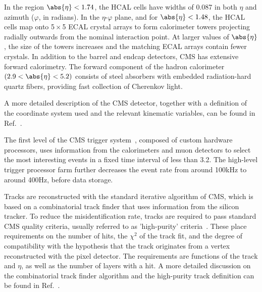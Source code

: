 \documentclass[11pt,twoside,a4paper,cmspaper,final,collab]{cms-tdr}
\begin{document}
 In the region $\abs{ \eta }< 1.74$, the HCAL cells have widths of 0.087 in both $\eta$ and azimuth ($\varphi$, in radians). In the $\eta$-$\varphi$ plane, and for $\abs{\eta}< 1.48$, the HCAL cells map onto 5${}\times{}$5 ECAL crystal arrays to form calorimeter towers projecting radially outwards from the nominal interaction point. At larger values of $\abs{ \eta }$, the size of the towers increases and the matching ECAL arrays contain fewer crystals. In addition to the barrel and endcap detectors, CMS has extensive forward calorimetry. The forward component of the hadron calorimeter $(2.9<\abs{\eta}<5.2)$ consists of steel absorbers with embedded radiation-hard quartz fibers, providing fast collection of Cherenkov light.

A more detailed description of the CMS detector, together with a definition of the coordinate system used and the relevant kinematic variables, can be found in Ref.~\cite{Chatrchyan:2008zzk}.

The first level of the CMS trigger system~\cite{CMStrigger}, composed of custom hardware processors, uses information from the calorimeters and muon detectors to select the most interesting events in a fixed time interval of less than 3.2\mus. The high-level trigger processor farm further decreases the event rate from around 100\unit{kHz} to around 400\unit{Hz}, before data storage.


Tracks are reconstructed with the standard iterative algorithm of CMS, which is based on a combinatorial track finder
that uses information from the silicon tracker. To reduce the misidentification rate, tracks are required to pass standard CMS quality criteria, usually referred to as 'high-purity' criteria~\cite{TRK-11-001}. These place requirements on the number of hits, the $\chi^2$ of the track fit, and the degree of compatibility with the hypothesis that the track originates from a vertex reconstructed with the pixel detector. The requirements are functions of the track \pt and $\eta$, as well as the number of layers with a hit. A more detailed discussion on the
combinatorial track finder algorithm and the high-purity track definition can be found in Ref.~\cite{TRK-11-001}.
\end{document}
